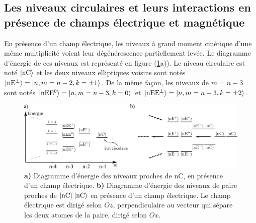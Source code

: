 \subsection{Les niveaux circulaires et leurs interactions en présence de champs électrique et magnétique}
\noindent En présence d'un champ électrique, les niveaux à grand moment cinétique d'une même multiplicité voient leur dégénérescence partiellement levée.
Le diagramme d'énergie de ces niveaux est représenté en figure (\ref{fig:ener_StarknC_nCnC}a)).
Le niveau circulaire est noté $\ket{\mathrm{nC}}$ et les deux niveaux \og elliptiques \fg{} voisins sont notés $\ket{\mathrm{nE^{\pm}}} = \ket{n,m=n-2,k=\pm1}$.
De la même façon, les niveaux de $m=n-3$ sont notés $\ket{\mathrm{nEE^0}} = \ket{n,m=n-3,k=0}$ et $\ket{\mathrm{nEE^{\pm}}} = \ket{n,m=n-3,k=\pm 2}$.
%
\begin{figure}[!h]
\centering
\includegraphics[width=\linewidth]{figures/circsim/diagram_nC_nCnC}
\caption[Diagammre d'énergie des niveaux proches du $\mathrm{50C}$]{
\textbf{a)} Diagramme d'énergie des niveaux proches de $\mathrm{nC}$, en présence d'un champ électrique.
\textbf{b)} Diagramme d'énergie des niveaux de paire proches de $\ket{\mathrm{nC}}\ket{\mathrm{nC}}$ en présence d'un champ électrique.
Le champ électrique est dirigé selon $Oz$, perpendiculaire au vecteur qui sépare les deux atomes de la paire,  dirigé selon $Ox$.
}
\label{fig:ener_StarknC_nCnC}
\end{figure}


